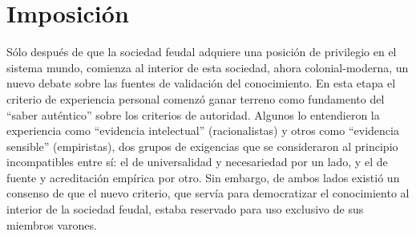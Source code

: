 \documentclass[a4paper,10pt]{book}
\theoremstyle{definition}
\begin{document}
\section{Imposición}

Sólo después de que la sociedad feudal adquiere una posición de privilegio en el sistema mundo, comienza al interior de esta sociedad, ahora colonial-moderna, un nuevo debate sobre las fuentes de validación del conocimiento.
En esta etapa el criterio de experiencia personal comenzó ganar terreno como fundamento del ``saber auténtico'' sobre los criterios de autoridad.
Algunos lo entendieron la experiencia como ``evidencia intelectual'' (racionalistas) y otros como ``evidencia sensible'' (empiristas), dos grupos de exigencias que se consideraron al principio incompatibles entre sí: el de universalidad y necesariedad por un lado, y el de fuente y acreditación empírica por otro.
Sin embargo, de ambos lados existió un consenso de que el nuevo criterio, que servía para democratizar el conocimiento al interior de la sociedad feudal, estaba reservado para uso exclusivo de sus miembros varones.

\end{document}
